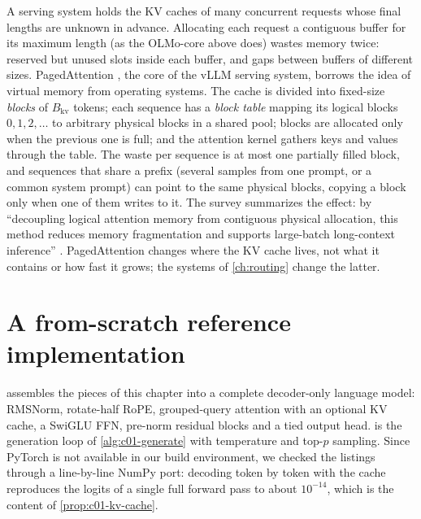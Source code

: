 A serving system holds the KV caches of many concurrent requests whose final lengths are
unknown in advance. Allocating each request a contiguous buffer for its maximum length (as
the OLMo-core  above does) wastes memory twice: reserved but unused
slots inside each buffer, and gaps between buffers of different sizes.
PagedAttention \citep{kwon2023paged}, the core of the vLLM serving system, borrows the idea of
virtual memory from operating systems. The cache is divided into fixed-size \emph{blocks} of
$B_{\mathrm{kv}}$ tokens; each sequence has a \emph{block table} mapping its logical blocks
$0, 1, 2, \dots$ to arbitrary physical blocks in a shared pool; blocks are allocated only when
the previous one is full; and the attention kernel gathers keys and values through the
table. The waste per sequence is at most one partially filled block, and sequences that share
a prefix (several samples from one prompt, or a common system prompt) can point to the same
physical blocks, copying a block only when one of them writes to it. The survey summarizes
the effect: by ``decoupling logical attention memory from contiguous physical allocation,
this method reduces memory fragmentation and supports large-batch long-context inference''
\citep{zhoubian2026memory}. PagedAttention changes where the KV cache lives, not what it
contains or how fast it grows; the systems of \cref{ch:routing} change the latter.

\section{A from-scratch reference implementation}\label{sec:c01-reference}

 assembles the pieces of this chapter into a complete decoder-only
language model: RMSNorm, rotate-half RoPE, grouped-query attention with an optional KV cache,
a SwiGLU FFN, pre-norm residual blocks and a tied output head.  is
the generation loop of \cref{alg:c01-generate} with temperature and top-$p$ sampling. Since
PyTorch is not available in our build environment, we checked the listings through a
line-by-line NumPy port: decoding token by token with the cache reproduces the logits of a
single full forward pass to about $10^{-14}$, which is the content of
\cref{prop:c01-kv-cache}.


